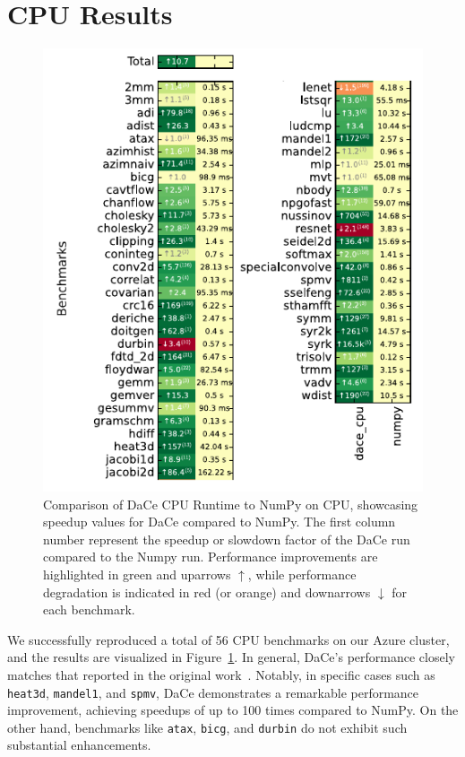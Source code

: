 \section{CPU Results}
\label{sec:cpu-result}

\begin{figure}[tp]
    \centering
    \includegraphics[width=.45\textwidth]{imgs/figure_cpu_crop.pdf}
    \caption{Comparison of DaCe CPU Runtime to NumPy on CPU, showcasing speedup values for DaCe compared to NumPy. The first column number represent the speedup or slowdown factor of the DaCe run compared to the Numpy run. Performance improvements are highlighted in green and uparrows $\uparrow$, while performance degradation is indicated in red (or orange) and downarrows $\downarrow$ for each benchmark.}
    \label{fig:heatmap_cpu}
\end{figure}

We successfully reproduced a total of 56 CPU benchmarks on our Azure cluster, and the results are visualized in Figure~\ref{fig:heatmap_cpu}. In general, DaCe's performance closely matches that reported in the original work~\cite{dace2021}. Notably, in specific cases such as \texttt{heat3d}, \texttt{mandel1}, and \texttt{spmv}, DaCe demonstrates a remarkable performance improvement, achieving speedups of up to 100 times compared to NumPy. On the other hand, benchmarks like \texttt{atax}, \texttt{bicg}, and \texttt{durbin} do not exhibit such substantial enhancements.

